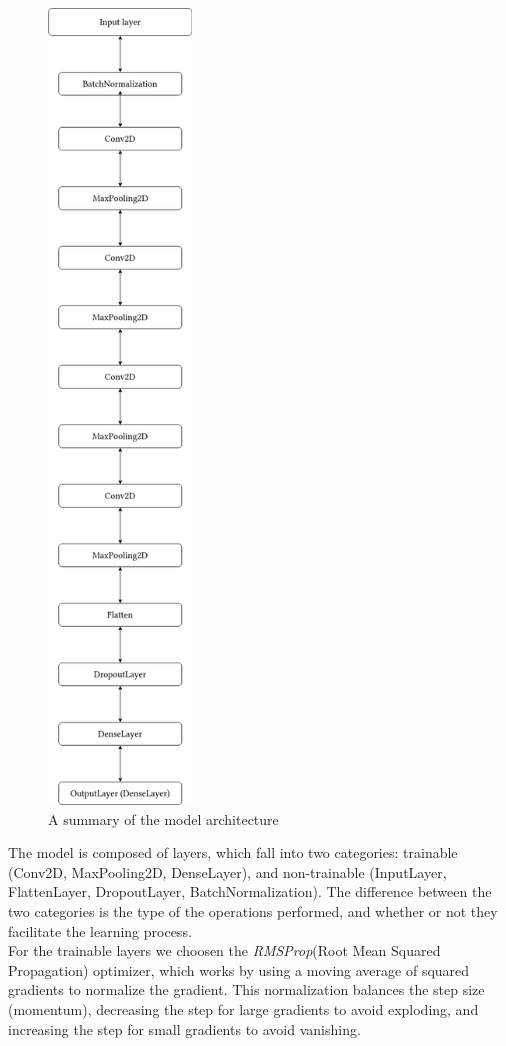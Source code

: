 \begin{figure}[H]
	\centering
	\includegraphics[width = 1.5in]{images/summary.png}
	\caption{A summary of the model architecture}
\label{model_arch}
\end{figure}

The model is composed of layers, which fall into two categories: trainable (Conv2D, MaxPooling2D, DenseLayer), and non-trainable
(InputLayer, FlattenLayer, DropoutLayer, BatchNormalization). The difference between the two categories is the type of the operations
performed, and whether or not they facilitate the learning process.\\

For the trainable layers we choosen the \textit{RMSProp}(Root Mean Squared Propagation) optimizer, which works
by using a moving average of squared gradients to normalize the gradient. This normalization balances
the step size (momentum), decreasing the step for large gradients to avoid exploding, and increasing the
step for small gradients to avoid vanishing.\cite{rmsprop}

